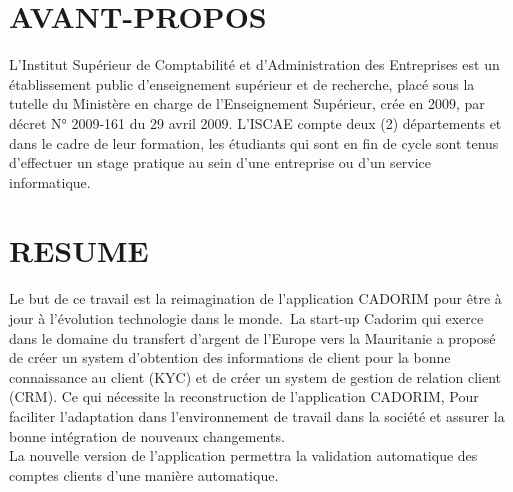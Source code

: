 \documentclass[a4paper, 12pt]{report}
\begin{document}
	 \chapter*{AVANT-PROPOS} \label{chap:1AVANT-PROPOS}
	L’Institut Supérieur de Comptabilité et d’Administration des Entreprises est un établissement public d’enseignement supérieur et de recherche, placé sous la tutelle du Ministère en charge de l’Enseignement Supérieur, crée en 2009, par décret N° 2009-161 du 29 avril 2009.
	\newline
	L’ISCAE compte deux (2) départements et dans le cadre de leur formation, les étudiants qui sont en fin de cycle sont tenus d’effectuer un stage pratique au sein d’une entreprise ou d’un service informatique.
	\thispagestyle{empty}
	\chapter*{RESUME} \label{chap:1Resumé}

		Le but de ce travail est la reimagination de l'application CADORIM pour être à jour à l'évolution  technologie dans le monde. La start-up Cadorim qui exerce dans le domaine du transfert d’argent de l’Europe vers la Mauritanie a proposé de créer un system d'obtention  des informations de client  pour  la bonne connaissance au client (KYC) et de créer un system de gestion de relation client (CRM). Ce qui nécessite la reconstruction de l'application CADORIM, Pour faciliter l'adaptation dans l'environnement de travail  dans la société et  assurer la bonne intégration de nouveaux changements.
		\\La nouvelle version de l'application permettra la validation automatique des comptes clients d'une manière automatique.
	
\end{document}
